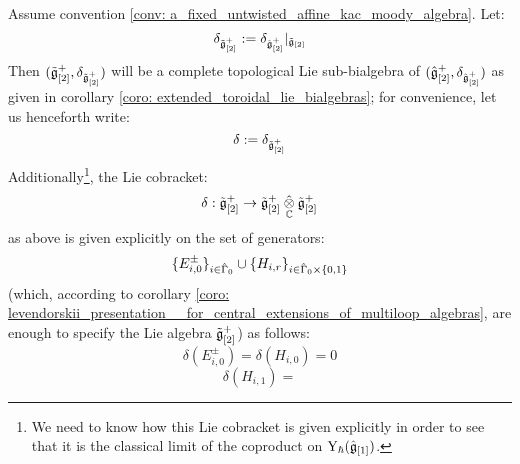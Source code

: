             \begin{lemma} \label{lemma: toroidal_lie_bialgebras}
                Assume convention \ref{conv: a_fixed_untwisted_affine_kac_moody_algebra}. Let:
                    $$\delta_{\tilde{\mathfrak{g}}_{[2]}^+} := \delta_{\hat{\mathfrak{g}}_{[2]}^+}|_{\tilde{\mathfrak{g}}_{[2]}}$$
                Then $(\tilde{\mathfrak{g}}_{[2]}^+, \delta_{\tilde{\mathfrak{g}}_{[2]}^+})$ will be a complete topological Lie sub-bialgebra of $(\hat{\mathfrak{g}}_{[2]}^+, \delta_{\hat{\mathfrak{g}}_{[2]}^+})$ as given in corollary \ref{coro: extended_toroidal_lie_bialgebras}; for convenience, let us henceforth write:
                    $$\delta := \delta_{\tilde{\mathfrak{g}}_{[2]}^+}$$
                Additionally\footnote{We need to know how this Lie cobracket is given explicitly in order to see that it is the classical limit of the coproduct on $\mathrm{Y}_{\hbar}(\hat{\mathfrak{g}}_{[1]})$.}, the Lie cobracket:
                    $$\delta: \tilde{\g}_{[2]}^+ \to \tilde{\g}_{[2]}^+ \hattensor_{\bbC} \tilde{\g}_{[2]}^+$$
                as above is given explicitly on the set of generators:
                    $$\{ E_{i, 0}^{\pm} \}_{i \in \hat{\Gamma}_0} \cup \{ H_{i, r} \}_{i \in \hat{\Gamma}_0 \x \{0, 1\}}$$
                (which, according to corollary \ref{coro: levendorskii_presentation__for_central_extensions_of_multiloop_algebras}, are enough to specify the Lie algebra $\tilde{\mathfrak{g}}_{[2]}^+$) as follows:
                    $$\delta(E_{i, 0}^{\pm}) = \delta(H_{i, 0}) = 0$$
                    $$\delta(H_{i, 1}) = $$
            \end{lemma}
